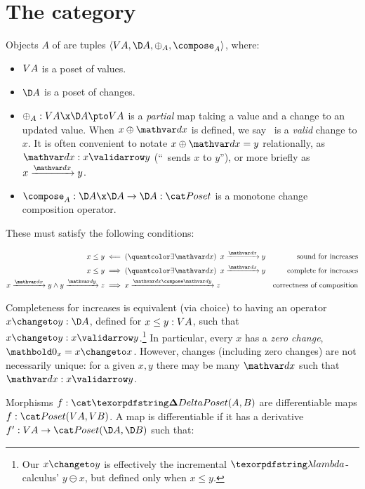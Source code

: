\section{The category \CP}
\label{sec:changeposets}

Objects $A$ of \CP{} are tuples $\tuple{\vals A, \chgs A, \updfn_A,
  \composefn_A}$, where:

\begin{itemize}
\item $V A$ is a poset of values.

\item $\chgs A$ is a poset of changes.

\item $\updfn_A : \vals A \x \chgs A \pto \vals A$ is a \emph{partial} map
  taking a value and a change to an updated value. When $x \upd \dx$ is defined,
  we say \dx\ is a \emph{valid} change to $x$. It is often convenient to notate
  $x \upd \dx = y$ relationally, as $\valid\dx x y$ (``\dx\ sends $x$ to $y$''),
  or more briefly as $\vld\dx x y$.

\item $\composefn_A : \chgs A \x \chgs A \to \chgs A : \Poset$ is a monotone
  change composition operator.
\end{itemize}

\noindent
These must satisfy the following conditions:

\nopagebreak[2]
\begin{align*}
  x \le y &\impliedby \ex{\dx} \vld{\dx} x y
  & \text{sound for increases}\\
  x \le y &\implies \ex{\dx} \vld{\dx} x y
  & \text{complete for increases}\\
  \vld\dx x y \wedge \vld\dy y z &\implies \vld{\dx\compose\dy} x z
  & \text{correctness of composition}
\end{align*}

\noindent Completeness for increases is equivalent (via choice) to having an
operator $x \changeto y : \chgs A$, defined for $x \le y : V A$, such that
$\valid{x \changeto y} x y$.\footnote{Our $x \changeto y$ is effectively the
  incremental $\fn$-calculus' $y \ominus x$, but defined only when $x \le y$.}
In particular, every $x$ has a \emph{zero change}, $\zero_x = x \changeto x$.
However, changes (including zero changes) are not necessarily unique: for a
given $x,y$ there may be many $\dx$ such that $\valid\dx x y$.

Morphisms $f : \CP(A, B)$ are differentiable maps $f : \Poset(\vals A, \vals
B)$. A map is differentiable if it has a derivative $\deriv f : \vals A \to
\Poset(\chgs A, \chgs B)$ such that:

